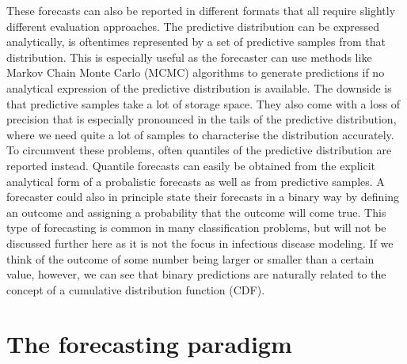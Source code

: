\documentclass[
]{book}
\begin{document}
These forecasts can also be reported in different formats that all require slightly different evaluation approaches. The predictive distribution can be expressed analytically, is oftentimes represented by a set of predictive samples from that distribution. This is especially useful as the forecaster can use methods like Markov Chain Monte Carlo (MCMC) algorithms to generate predictions if no analytical expression of the predictive distribution is available. The downside is that predictive samples take a lot of storage space. They also come with a loss of precision that is especially pronounced in the tails of the predictive distribution, where we need quite a lot of samples to characterise the distribution accurately. To circumvent these problems, often quantiles of the predictive distribution are reported instead. Quantile forecasts can easily be obtained from the explicit analytical form of a probalistic forecasts as well as from predictive samples. A forecaster could also in principle state their forecasts in a binary way by defining an outcome and assigning a probability that the outcome will come true. This type of forecasting is common in many classification problems, but will not be discussed further here as it is not the focus in infectious disease modeling. If we think of the outcome of some number being larger or smaller than a certain value, however, we can see that binary predictions are naturally related to the concept of a cumulative distribution function (CDF).

\hypertarget{the-forecasting-paradigm}{%
\section{The forecasting paradigm}\label{the-forecasting-paradigm}}
\end{document}
